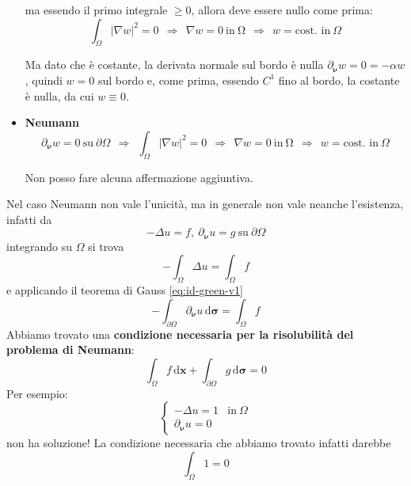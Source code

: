 \documentclass[10pt,a4paper,twoside,openright]{book}
\newcommand{\x}{\mathbf{x}}
\newcommand{\sigg}{\bm{\sigma}}
\newcommand{\nuu}{\bm{\nu}}
\newcommand{\de}{\,\mathrm d}
\newcommand{\dxx}{\de \x}
\newcommand{\dsig}{\de \sigg}
\begin{document}
\begin{dimostrazione}
\begin{itemize}
              ma essendo il primo integrale $\displaystyle \geqslant 0$, allora deve essere nullo come prima:
              \begin{equation*}
                  \int _{\Omega }| \nabla w| ^{2} =0\ \ \Rightarrow \ \ \nabla w=0\ \text{in} \ \mathrm{\Omega } \ \ \Rightarrow \ \ w=\text{cost. in} \ \Omega
              \end{equation*}

              Ma dato che è costante, la derivata normale sul bordo è nulla $\displaystyle \partial_{\nuu} w=0=-\alpha w$, quindi $w=0$ sul bordo e, come prima, essendo $\displaystyle C^{1}$ fino al bordo, la costante è nulla, da cui $\displaystyle w\equiv 0$.
        \item \textbf{Neumann}
              \begin{equation*}
                  \partial_{\nuu} w=0\ \text{su} \ \partial \Omega \ \ \Rightarrow \ \ \int _{\Omega }| \nabla w| ^{2} =0\ \ \Rightarrow \ \ \nabla w=0\ \text{in} \ \mathrm{\Omega } \ \ \Rightarrow \ \ w=\text{cost. in} \ \Omega
              \end{equation*}

              Non posso fare alcuna affermazione aggiuntiva.
    \end{itemize}
\end{dimostrazione}
Nel caso Neumann non vale l'unicità, ma in generale non vale neanche l'esistenza, infatti da
\begin{equation*}
    -\Delta u=f,\ \partial _{\nuu} u=g\ \text{su} \ \partial \Omega
\end{equation*}
integrando su $\displaystyle \Omega $ si trova
\begin{equation*}
    -\int _{\Omega } \Delta u=\int _{\Omega } f
\end{equation*}
e applicando il teorema di Gauss \eqref{eq:id-green-v1}
\begin{equation*}
    -\int _{\partial \Omega } \partial_{\nuu} u\dsig =\int _{\Omega } f
\end{equation*}
Abbiamo trovato una \textbf{condizione necessaria per la risolubilità del problema di Neumann}:
\begin{equation}
    \boxed{\int _{\Omega } f\dxx+\int _{\partial \Omega } g\dsig =0}
\end{equation}
Per esempio:
\begin{equation*}
    \begin{cases}
        -\Delta u=1          & \text{in} \ \Omega \\
        \partial _{\nuu} u=0 &
    \end{cases}
\end{equation*}
non ha soluzione! La condizione necessaria che abbiamo trovato infatti darebbe
\begin{equation*}
    \int _{\Omega } 1=0
\end{equation*}
\end{document}

